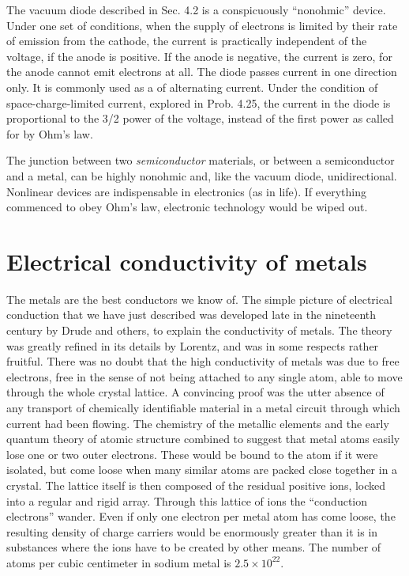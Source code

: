 The vacuum diode described in Sec. 4.2 is a conspicuously ``nonohmic''
device. Under one set of conditions, when the supply of
electrons is limited by their rate of emission from the cathode, the
current is practically independent of the voltage, if the anode is positive.
If the anode is negative, the current is zero, for the anode cannot
emit electrons at all. The diode passes current in one direction
only. It is commonly used as a  of alternating current.
Under the condition of space-charge-limited current, explored in
Prob. 4.25, the current in the diode is proportional to the 3/2 power
of the voltage, instead of the first power as called for by Ohm's law.

The junction between two \emph{semiconductor} materials, or between a
semiconductor and a metal, can be highly nonohmic and, like the
vacuum diode, unidirectional. Nonlinear devices are indispensable
in electronics (as in life). If everything commenced to obey Ohm's
law, electronic technology would be wiped out.

\section{Electrical conductivity of metals}

The metals are the best conductors we know of. The simple picture
of electrical conduction that we have just described was developed
late in the nineteenth century by Drude and others, to explain
the conductivity of metals. The theory was greatly refined in its details
by Lorentz, and was in some respects rather fruitful. There
was no doubt that the high conductivity of metals was due to
free electrons, free in the sense of not being attached to any single
atom, able to move through the whole crystal lattice. A convincing
proof was the utter absence of any transport of chemically identifiable
material in a metal circuit through which current had been flowing.
The chemistry of the metallic elements and the early quantum theory
of atomic structure combined to suggest that metal atoms easily lose
one or two outer electrons. These would be bound to the atom if it
were isolated, but come loose when many similar atoms are packed
close together in a crystal. The lattice itself is then composed of the
residual positive ions, locked into a regular and rigid array. Through
this lattice of ions the ``conduction electrons'' wander. Even if only
one electron per metal atom has come loose, the resulting density of
charge carriers would be enormously greater than it is in substances
where the ions have to be created by other means. The number of
atoms per cubic centimeter in sodium metal is $2.5\times10^{22}$.

